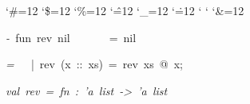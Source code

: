 \begin{list}{}
{\setlength{\leftmargin}{\leftmargini}
\setlength{\rightmargin}{0cm}
\setlength{\itemindent}{0cm}
\setlength{\listparindent}{0cm}
\setlength{\itemsep}{0cm}
\setlength{\parsep}{0cm}
\setlength{\labelsep}{0cm}
\setlength{\labelwidth}{0cm}
\catcode`\#=12
\catcode`\$=12
\catcode`\%=12
\catcode`\^=12
\catcode`\_=12
\catcode`\.=12
\catcode`
\catcode`
\catcode`\&=12
\ttfamily}
\small
\item[]\textsl{-\ }fun\ rev\ nil\ \ \ \ \ \ \ =\ nil
\item[]\textsl{=\ }\ \ |\ rev\ (x\ ::\ xs)\ =\ rev\ xs\ @\ x;
\item[]\textsl{val\ rev\ =\ fn\ :\ 'a\ list\ ->\ 'a\ list}
\end{list}
